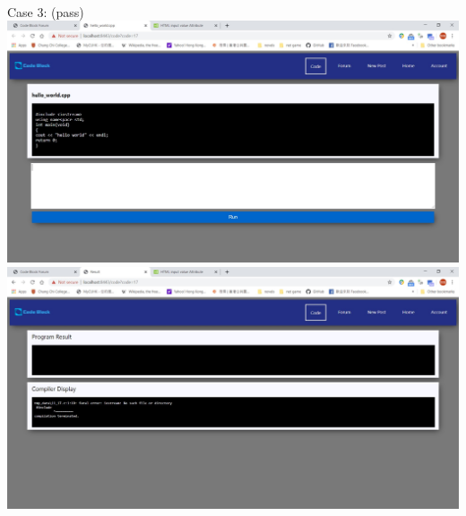 ~

Case 3: (pass)\\
\includegraphics[scale=0.45]{Doc/Pics/case-7-3-1}\\
\includegraphics[scale=0.45]{Doc/Pics/case-7-3-2}\\

~

